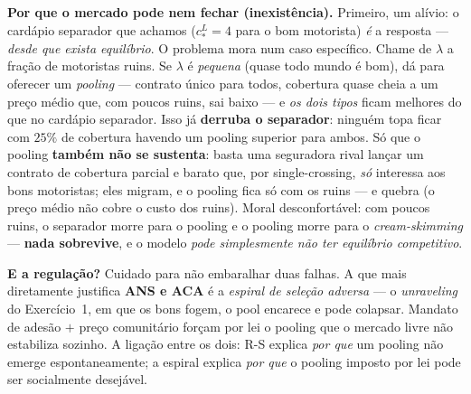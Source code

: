 \documentclass[11pt,a4paper]{article}
\begin{document}
\begin{enumerate}[leftmargin=2em,itemsep=4pt]
\begin{empalavras}
\smallskip\noindent
\textbf{Por que o mercado pode nem fechar (inexistência).} Primeiro, um alívio: o cardápio
separador que achamos ($c^L_\ast = 4$ para o bom motorista) \emph{é} a resposta —
\emph{desde que exista equilíbrio}. O problema mora num caso específico. Chame de $\lambda$ a
fração de motoristas ruins. Se $\lambda$ é \emph{pequena} (quase todo mundo é bom), dá para
oferecer um \emph{pooling} — contrato único para todos, cobertura quase cheia a um preço
médio que, com poucos ruins, sai baixo — e \emph{os dois tipos} ficam melhores do que no
cardápio separador. Isso já \textbf{derruba o separador}: ninguém topa ficar com $25\%$ de
cobertura havendo um pooling superior para ambos. Só que o pooling \textbf{também não se
sustenta}: basta uma seguradora rival lançar um contrato de cobertura parcial e barato que,
por single-crossing, \emph{só} interessa aos bons motoristas; eles migram, e o pooling fica
só com os ruins — e quebra (o preço médio não cobre o custo dos ruins). Moral desconfortável:
com poucos ruins, o separador morre para o pooling e o pooling morre para o
\emph{cream-skimming} — \textbf{nada sobrevive}, e o modelo \emph{pode simplesmente não ter
equilíbrio competitivo}.

\smallskip\noindent
\textbf{E a regulação?} Cuidado para não embaralhar duas falhas. A que mais diretamente
justifica \textbf{ANS e ACA} é a \emph{espiral de seleção adversa} — o \emph{unraveling} do
Exercício~1, em que os bons fogem, o pool encarece e pode colapsar. Mandato de adesão $+$
preço comunitário forçam por lei o pooling que o mercado livre não estabiliza sozinho. A
ligação entre os dois: R-S explica \emph{por que} um pooling não emerge espontaneamente; a
espiral explica \emph{por que} o pooling imposto por lei pode ser socialmente desejável.
\end{empalavras}

\end{enumerate}
\end{document}
